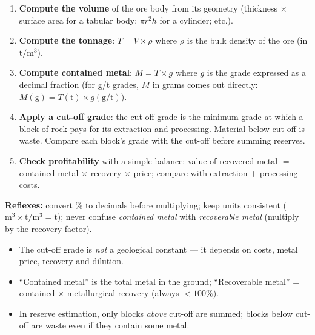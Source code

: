 \documentclass[11pt]{article}
\newcommand{\cle}[1]{{\popxbold\color{popdark}#1}}
\begin{document}
\begin{methode}
\begin{enumerate}
\item \textbf{Compute the volume} of the ore body from its geometry (thickness $\times$ surface area for a tabular body; $\pi r^2 h$ for a cylinder; etc.).
\item \textbf{Compute the tonnage}: $T = V \times \rho$ where $\rho$ is the bulk density of the ore (in $\mathrm{t/m^3}$).
\item \textbf{Compute contained metal}: $M = T \times g$ where $g$ is the grade expressed as a decimal fraction (for g/t grades, $M$ in grams comes out directly: $M(\mathrm{g}) = T(\mathrm{t}) \times g(\mathrm{g/t})$).
\item \textbf{Apply a cut-off grade}: the \cle{cut-off grade} is the minimum grade at which a block of rock pays for its extraction and processing. Material below cut-off is waste. Compare each block's grade with the cut-off before summing reserves.
\item \textbf{Check profitability} with a simple balance: value of recovered metal $=$ contained metal $\times$ recovery $\times$ price; compare with extraction + processing costs.
\end{enumerate}
\textbf{Reflexes:} convert \% to decimals before multiplying; keep units consistent ($\mathrm{m^3} \times \mathrm{t/m^3} = \mathrm{t}$); never confuse \emph{contained metal} with \emph{recoverable metal} (multiply by the recovery factor).
\end{methode}

\begin{attention}
\begin{itemize}
\item The cut-off grade is \emph{not} a geological constant — it depends on costs, metal price, recovery and dilution.
\item ``Contained metal'' is the total metal in the ground; ``Recoverable metal'' = contained $\times$ metallurgical recovery (always $< 100\%$).
\item In reserve estimation, only blocks \emph{above} cut-off are summed; blocks below cut-off are waste even if they contain some metal.
\end{itemize}
\end{attention}
\end{document}
